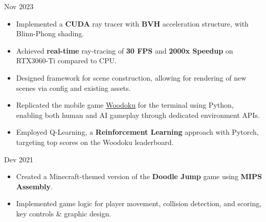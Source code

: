 \documentclass[10pt,a4paper,ragged2e,withhyper]{altacv}
\begin{document}
\begin{paracol}{2}
    \vspace{-5pt}

    {Nov 2023 
    }{}
    \begin{itemize}
        \item Implemented a \textbf{CUDA} ray tracer with \textbf{BVH} acceleration structure, with Blinn-Phong shading.
        \item Achieved \textbf{real-time} ray-tracing of \textbf{30 FPS} and \textbf{2000x Speedup} on RTX3060-Ti compared to CPU\@.
        \item Designed framework for scene construction, allowing for rendering
              of new scenes via config and existing assets. \end{itemize}


    \vspace{-5pt}
    \divider{}
    \begin{itemize}

        \item Replicated the mobile game \href{https://play.google.com/store/apps/details?id=com.tripledot.woodoku&hl=en_CA&gl=US}{Woodoku} for the terminal using Python, enabling both human and AI gameplay through dedicated environment APIs.
        \item Employed Q-Learning, a \textbf{Reinforcement Learning} approach with Pytorch, targeting top scores on the Woodoku leaderboard.

    \end{itemize}

    \vspace{-5pt}
    \divider{}
    {Dev 2021 }{}
    \begin{itemize}
        \item Created a Minecraft-themed version of the \textbf{Doodle Jump} game using \textbf{MIPS Assembly}.
        \item Implemented game logic for player movement, collision detection, and scoring, key controls \& graphic design.
    \end{itemize}
    

\end{paracol}
\end{document}
